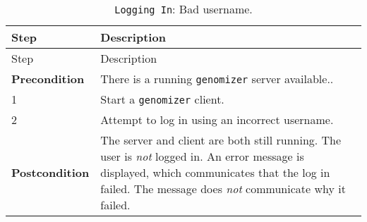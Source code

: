 \begin{longtable}[c]{@{}ll@{}}
\caption{\texttt{Logging\ In}: Bad username.}\tabularnewline
\toprule
\begin{minipage}[b]{0.27\columnwidth}\raggedright\strut
Step
\strut\end{minipage} &
\begin{minipage}[b]{0.64\columnwidth}\raggedright\strut
Description
\strut\end{minipage}\tabularnewline
\midrule
\endfirsthead
\toprule
\begin{minipage}[b]{0.27\columnwidth}\raggedright\strut
Step
\strut\end{minipage} &
\begin{minipage}[b]{0.64\columnwidth}\raggedright\strut
Description
\strut\end{minipage}\tabularnewline
\midrule
\endhead
\begin{minipage}[t]{0.27\columnwidth}\raggedright\strut
\textbf{Precondition}
\strut\end{minipage} &
\begin{minipage}[t]{0.64\columnwidth}\raggedright\strut
There is a running \texttt{genomizer} server available..
\strut\end{minipage}\tabularnewline
\begin{minipage}[t]{0.27\columnwidth}\raggedright\strut
1
\strut\end{minipage} &
\begin{minipage}[t]{0.64\columnwidth}\raggedright\strut
Start a \texttt{genomizer} client.
\strut\end{minipage}\tabularnewline
\begin{minipage}[t]{0.27\columnwidth}\raggedright\strut
2
\strut\end{minipage} &
\begin{minipage}[t]{0.64\columnwidth}\raggedright\strut
Attempt to log in using an incorrect username.
\strut\end{minipage}\tabularnewline
\begin{minipage}[t]{0.27\columnwidth}\raggedright\strut
\textbf{Postcondition}
\strut\end{minipage} &
\begin{minipage}[t]{0.64\columnwidth}\raggedright\strut
The server and client are both still running. The user is \emph{not}
logged in. An error message is displayed, which communicates that the
log in failed. The message does \emph{not} communicate why it failed.
\strut\end{minipage}\tabularnewline
\bottomrule
\end{longtable}

